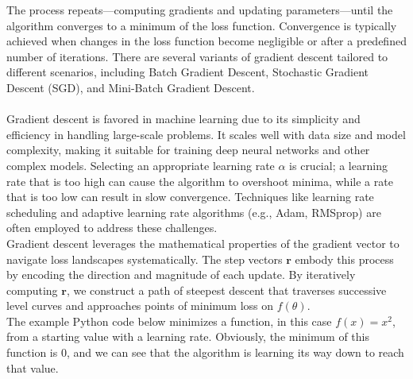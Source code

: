 \noindent The process repeats—computing gradients and updating parameters—until the algorithm converges to a minimum of the loss function. Convergence is typically achieved when changes in the loss function become negligible or after a predefined number of iterations. There are several variants of gradient descent tailored to different scenarios, including Batch Gradient Descent, Stochastic Gradient Descent (SGD), and Mini-Batch Gradient Descent. \\ \\ Gradient descent is favored in machine learning due to its simplicity and efficiency in handling large-scale problems. It scales well with data size and model complexity, making it suitable for training deep neural networks and other complex models. Selecting an appropriate learning rate \( \alpha \) is crucial; a learning rate that is too high can cause the algorithm to overshoot minima, while a rate that is too low can result in slow convergence. Techniques like learning rate scheduling and adaptive learning rate algorithms (e.g., Adam, RMSprop) are often employed to address these challenges. \\

\noindent Gradient descent leverages the mathematical properties of the gradient vector to navigate loss landscapes systematically. The step vectors \( \mathbf{r} \) embody this process by encoding the direction and magnitude of each update. By iteratively computing \( \mathbf{r} \), we construct a path of steepest descent that traverses successive level curves and approaches points of minimum loss on \( f(\theta) \). \\

\noindent The example Python code below minimizes a function, in this case $f(x) = x^2$, from a starting value with a learning rate. Obviously, the minimum of this function is $0$, and we can see that the algorithm is learning its way down to reach that value.

\vspace{1.3em} 


